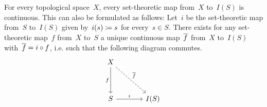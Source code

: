 \section{}

For every topological space~$X$, every set-theoretic map from~$X$ to~$I(S)$ is continuous.
This can also be formulated as follows:
Let~$i$ be the set-theoretic map from~$S$ to~$I(S)$ given by~$i(s) \coloneqq s$ for every~$s \in S$.
There exists for any set-theoretic map~$f$ from~$X$ to~$S$ a unique continuous map~$\overline{f}$ from~$X$ to~$I(S)$ with~$\overline{f} = i \circ f$, i.e. such that the following diagram commutes.
\[
	\begin{tikzcd}[column sep = large, row sep = huge]
		X
		\arrow{d}[left]{f}
		\arrow[dashed]{dr}[above right]{\induced{f}}
		&
		{}
		\\
		S
		\arrow{r}[above]{i}
		&
		I(S)
	\end{tikzcd}
\]
